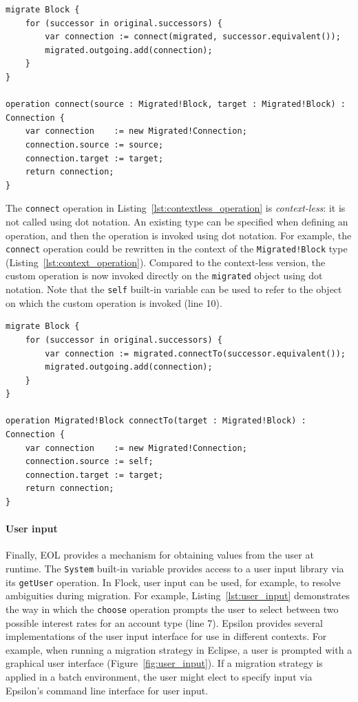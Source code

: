 \begin{lstlisting}[caption=Using a context-less custom operation, label=lst:contextless_operation, language=Flock, float=tb]
migrate Block {
	for (successor in original.successors) {
		var connection := connect(migrated, successor.equivalent());
		migrated.outgoing.add(connection);
	}
}

operation connect(source : Migrated!Block, target : Migrated!Block) : Connection {
	var connection    := new Migrated!Connection;
	connection.source := source;
	connection.target := target;
	return connection;
}
\end{lstlisting}

The \texttt{co\-nn\-ect} operation in Listing~\ref{lst:contextless_operation} is \emph{context-less}: it is not called using dot notation. An existing type can be specified when defining an operation, and then the operation is invoked using dot notation. For example, the \texttt{co\-nn\-e\-ct} operation could be rewritten in the context of the \texttt{Mi\-gr\-at\-ed!Bl\-o\-ck} type (Listing~\ref{lst:context_operation}). Compared to the context-less version, the custom operation is now invoked directly on the \texttt{mi\-gr\-at\-ed} object using dot notation. Note that the \texttt{self} built-in variable can be used to refer to the object on which the custom operation is invoked (line 10).

\begin{lstlisting}[caption=Using a custom operation in the context of a metamodel type, label=lst:context_operation, language=Flock, float=tb]
migrate Block {
	for (successor in original.successors) {
		var connection := migrated.connectTo(successor.equivalent());
		migrated.outgoing.add(connection);
	}
}

operation Migrated!Block connectTo(target : Migrated!Block) : Connection {
	var connection    := new Migrated!Connection;
	connection.source := self;
	connection.target := target;
	return connection;
}
\end{lstlisting}

\paragraph{User input} Finally, EOL provides a mechanism for obtaining values from the user at runtime. The \texttt{Sy\-st\-em} built-in variable provides access to a user input library via its \texttt{getUs\-er} operation. In Flock, user input can be used, for example, to resolve ambiguities during migration. For example, Listing~\ref{lst:user_input} demonstrates the way in which the \texttt{ch\-oo\-se} operation prompts the user to select between two possible interest rates for an account type (line 7). Epsilon provides several implementations of the user input interface for use in different contexts. For example, when running a migration strategy in Eclipse, a user is prompted with a graphical user interface (Figure~\ref{fig:user_input}). If a migration strategy is applied in a batch environment, the user might elect to specify input via Epsilon's command line interface for user input.

